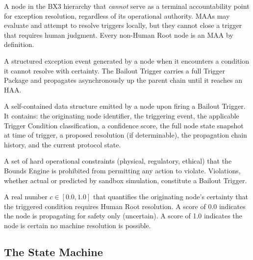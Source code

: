 \begin{definition}
A node in the BX3 hierarchy that \emph{cannot} serve as a terminal accountability point for exception resolution, regardless of its operational authority. MAAs may evaluate and attempt to resolve triggers locally, but they cannot close a trigger that requires human judgment. Every non-Human Root node is an MAA by definition.
\end{definition}

\begin{definition}
A structured exception event generated by a node when it encounters a condition it cannot resolve with certainty. The Bailout Trigger carries a full Trigger Package and propagates asynchronously up the parent chain until it reaches an HAA.
\end{definition}

\begin{definition}
A self-contained data structure emitted by a node upon firing a Bailout Trigger. It contains: the originating node identifier, the triggering event, the applicable Trigger Condition classification, a confidence score, the full node state snapshot at time of trigger, a proposed resolution (if determinable), the propagation chain history, and the current protocol state.
\end{definition}

\begin{definition}
A set of hard operational constraints (physical, regulatory, ethical) that the Bounds Engine is prohibited from permitting any action to violate. Violations, whether actual or predicted by sandbox simulation, constitute a Bailout Trigger.
\end{definition}

\begin{definition}
A real number $c \in [0.0, 1.0]$ that quantifies the originating node's certainty that the triggered condition requires Human Root resolution. A score of 0.0 indicates the node is propagating for safety only (uncertain). A score of 1.0 indicates the node is certain no machine resolution is possible.
\end{definition}

\subsection{The State Machine}

